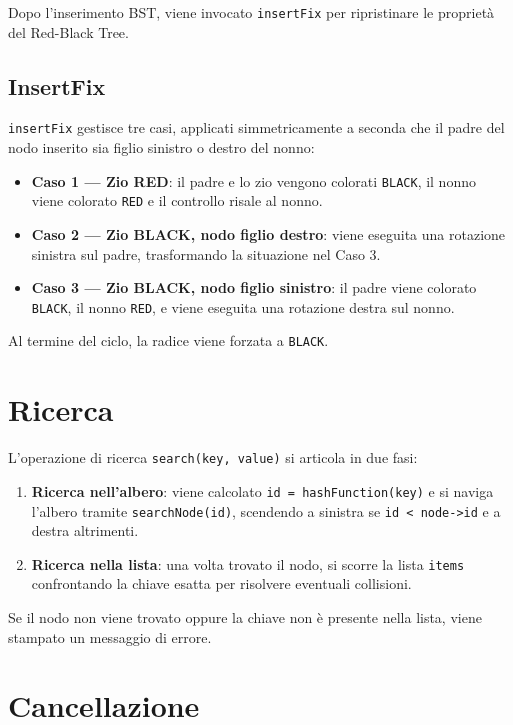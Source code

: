 Dopo l'inserimento BST, viene invocato \texttt{insertFix} per ripristinare 
le proprietà del Red-Black Tree.

\subsection{InsertFix}

\texttt{insertFix} gestisce tre casi, applicati simmetricamente a seconda che 
il padre del nodo inserito sia figlio sinistro o destro del nonno:

\begin{itemize}
    \item \textbf{Caso 1 --- Zio RED}: il padre e lo zio vengono colorati 
    \texttt{BLACK}, il nonno viene colorato \texttt{RED} e il controllo 
    risale al nonno.
    \item \textbf{Caso 2 --- Zio BLACK, nodo figlio destro}: viene eseguita 
    una rotazione sinistra sul padre, trasformando la situazione nel Caso 3.
    \item \textbf{Caso 3 --- Zio BLACK, nodo figlio sinistro}: il padre viene 
    colorato \texttt{BLACK}, il nonno \texttt{RED}, e viene eseguita una 
    rotazione destra sul nonno.
\end{itemize}

Al termine del ciclo, la radice viene forzata a \texttt{BLACK}.

\section{Ricerca}

L'operazione di ricerca \texttt{search(key, value)} si articola in due fasi:

\begin{enumerate}
    \item \textbf{Ricerca nell'albero}: viene calcolato \texttt{id = hashFunction(key)} 
    e si naviga l'albero tramite \texttt{searchNode(id)}, scendendo a sinistra 
    se \texttt{id < node->id} e a destra altrimenti.
    \item \textbf{Ricerca nella lista}: una volta trovato il nodo, si scorre 
    la lista \texttt{items} confrontando la chiave esatta per risolvere 
    eventuali collisioni.
\end{enumerate}

Se il nodo non viene trovato oppure la chiave non è presente nella lista, 
viene stampato un messaggio di errore.

\section{Cancellazione}

